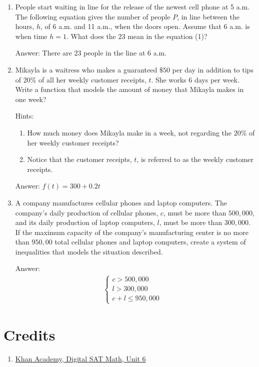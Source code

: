 \documentclass{article}
\begin{document}
\begin{enumerate}
	\item {People start waiting in line for the release of the newest cell phone at 5 a.m. The following equation gives the number of people $P$, in line between the hours, $h$, of 6 a.m. and 11 a.m., when the doors open. Assume that 6 a.m. is when time $h=1$. What does the $23$ mean in the equation (1)?

	      Answer: There are $23$ people in the line at 6 a.m.}

	\item {Mikayla is a waitress who makes a guaranteed $\$50$ per day in addition to tips of $20\%$ of all her weekly customer receipts, $t$. She works $6$ days per week. Write a function that models the amount of money that Mikayla makes in one week?

	      Hints:
	      \begin{enumerate}
		      \item{How much money does Mikayla make in a week, not regarding the $20\%$ of her weekly customer receipts?}
		      \item{Notice that the customer receipts, $t$, is referred to as the weekly customer receipts.}
	      \end{enumerate}

	      Answer: \(f(t)=300+0.2t\)}

	\item{A company manufactures cellular phones and laptop computers. The company's daily production of cellular phones, $c$, must be more than $500,000$, and its daily production of laptop computers, $l$, must be more than $300,000$. If the maximum capacity of the company's manufacturing center is no more than $950,00$ total cellular phones and laptop computers, create a system of inequalities that models the situation described.

	      Answer:
	      \[
		      \begin{array}{l}
			      \begin{cases}
				      c>500,000 & \\
				      l>300,000 & \\
				      c+l\leq950,000
			      \end{cases}
		      \end{array}
	      \]
	      }

\end{enumerate}

\section{Credits}
\begin{enumerate}

	\item{
	      \href{https://www.khanacademy.org/test-prep/v2-sat-math/x0fcc98a58ba3bea7:algebra-medium}{Khan Academy, Digital SAT Math, Unit 6}}

\end{enumerate}
\end{document}
